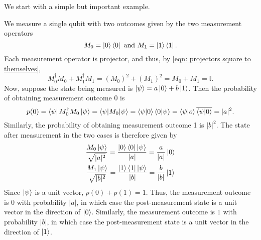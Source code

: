 We start with a simple but important example.
\begin{example} \label{measurement-standard basis}
We measure a single qubit with two outcomes given by the two measurement operators 
$$M_0=\ket{0}\bra{0}\textrm{ and }M_1=\ket{1}\bra{1}.$$ 
Each measurement operator is projector, and thus, by \eqref{eqn: projectors square to themselves},
\begin{equation*}
    M_0^\dagger M_0+M_1^\dagger M_1 = (M_0)^2+(M_1)^2=M_0 + M_1 = \mathbb{I}.
\end{equation*}
Now, suppose the state being measured is $\ket{\psi}=a\ket{0}+b\ket{1}$. Then the probability of obtaining measurement outcome 0 is
\begin{equation*}
    p(0) = \bra{\psi}M_0^\dagger M_0 \ket{\psi} = \braket{\psi | M_0 | \psi}=\braket{\psi|0}\braket{0|\psi}=\braket{\psi|o}\overline{\braket{\psi|0}}=|a|^2.
\end{equation*}
Similarly, the probability of obtaining measurement outcome 1 is $|b|^2$.
The state after measurement in the two cases is therefore given by
\begin{gather*}
    \frac{M_0 \ket{\psi}}{\sqrt{|a|^2}}=\frac{\ket{0}\bra{0}\ket{\psi}}{|a|}=\frac{a}{|a|}\ket{0}\\
    \frac{M_1 \ket{\psi}}{\sqrt{|b|^2}}=\frac{\ket{1}\bra{1}\ket{\psi}}{|b|}=\frac{b}{|b|}\ket{1}\\   
\end{gather*}
Since $\ket{\psi}$ is a unit vector, $p(0)+p(1)=1$.  Thus, the measurement outcome is $0$ with probability $|a|$, in which case the post-measurement state is a unit vector in the direction of $\ket{0}$.  Similarly, the measurement outcome is $1$ with probability $|b|$, in which case the post-measurement state is a unit vector in the direction of $\ket{1}$.
\end{example}


